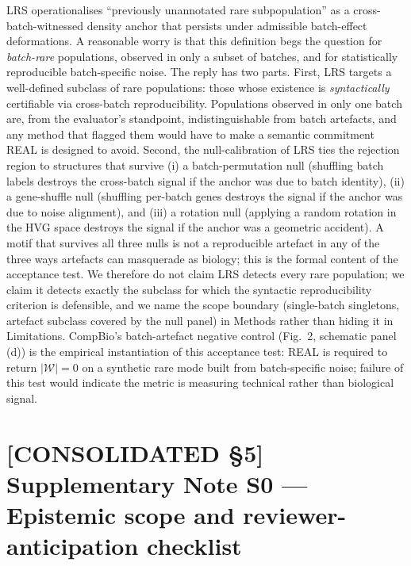 LRS operationalises ``previously unannotated rare subpopulation'' as a cross-batch-witnessed density anchor that persists under admissible batch-effect deformations. A reasonable worry is that this definition begs the question for \emph{batch-rare} populations, observed in only a subset of batches, and for statistically reproducible batch-specific noise. The reply has two parts. First, LRS targets a well-defined subclass of rare populations: those whose existence is \emph{syntactically} certifiable via cross-batch reproducibility. Populations observed in only one batch are, from the evaluator's standpoint, indistinguishable from batch artefacts, and any method that flagged them would have to make a semantic commitment REAL is designed to avoid. Second, the null-calibration of LRS ties the rejection region to structures that survive (i) a batch-permutation null (shuffling batch labels destroys the cross-batch signal if the anchor was due to batch identity), (ii) a gene-shuffle null (shuffling per-batch genes destroys the signal if the anchor was due to noise alignment), and (iii) a rotation null (applying a random rotation in the HVG space destroys the signal if the anchor was a geometric accident). A motif that survives all three nulls is not a reproducible artefact in any of the three ways artefacts can masquerade as biology; this is the formal content of the acceptance test. We therefore do not claim LRS detects every rare population; we claim it detects exactly the subclass for which the syntactic reproducibility criterion is defensible, and we name the scope boundary (single-batch singletons, artefact subclass covered by the null panel) in Methods rather than hiding it in Limitations. CompBio's batch-artefact negative control (Fig.~2, schematic panel (d)) is the empirical instantiation of this acceptance test: REAL is required to return $|\mathcal{W}| = 0$ on a synthetic rare mode built from batch-specific noise; failure of this test would indicate the metric is measuring technical rather than biological signal.

\section*{[CONSOLIDATED §5] Supplementary Note S0 --- Epistemic scope and reviewer-anticipation checklist}
\label{philo:supp_s0}

